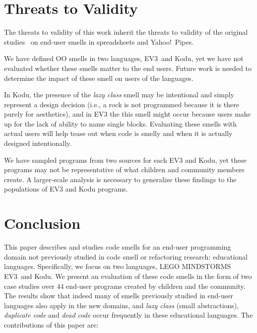 \documentclass[conference]{IEEEtran}
\newcommand{\ms}{LEGO MINDSTORMS EV3}
\begin{document}
%
%
%



\section{Threats to Validity}
\label{sec:threats}
The threats to validity of this work inherit the threats to validity of the original studies~\cite{Stolee2015, Stolee2011, StoleeTSE2013, Hermans2011, Hermans2012intra, Hermans2012inter} on end-user smells in spreadsheets and Yahoo!\ Pipes.


We have defined OO smells in two languages, EV3~and Kodu, yet we have not evaluated whether these smells matter to the end users. Future work is needed to determine the impact of these smell on users of the languages. 

In Kodu, the presence of the \emph{lazy class} smell may be intentional and simply represent a design decision (i.e., a rock is not programmed because it is there purely for aesthetics), and in EV3 the this smell might occur because users make up for the lack of ability to name single blocks. Evaluating these smells with actual users will help tease out when code is smelly and when it is actually designed intentionally. 

We have sampled programs from two sources for each EV3 and Kodu, yet these programs may not be representative of what children and community members create. A larger-scale analysis is necessary to generalize these findings to the populations of EV3 and Kodu programs. 

\section{Conclusion}
\label{sec:conclusions}
This paper describes and studies code smells for an end-user programming  domain not previously studied in code smell or refactoring research: educational languages. Specifically, we focus on two languages, \ms~and Kodu. We present an evaluation of these code smells in the form of two case studies over 44 end-user programs created by children and the community. The results show that indeed many of smells previously studied in end-user languages also apply in the new domains, and \emph{lazy class} (small abstractions), \emph{duplicate code} and \emph{dead code} occur frequently in these educational languages. The contributions of this paper are:
\end{document}
